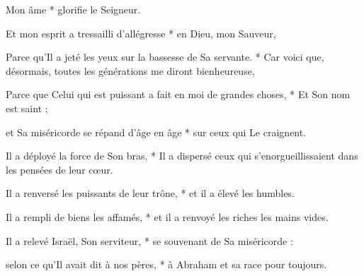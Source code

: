 \item Mon âme * glorifie le Seigneur.
\item Et mon esprit a tressailli d'allégresse * en Dieu, mon Sauveur,
\item Parce qu'Il a jeté les yeux sur la bassesse de Sa servante. * Car voici que, désormais, toutes les générations me diront bienheureuse,
\item Parce que Celui qui est puissant a fait en moi de grandes choses, * Et Son nom est saint ;
\item et Sa miséricorde se répand d'âge en âge * sur ceux qui Le craignent.
\item Il a déployé la force de Son bras, * Il a dispersé ceux qui s'enorgueillissaient dans les pensées de leur cœur.
\item Il a renversé les puissants de leur trône, * et il a élevé les humbles.
\item Il a rempli de biens les affamés, * et il a renvoyé les riches les mains vides.
\item Il a relevé Israël, Son serviteur, * se souvenant de Sa miséricorde :
\item selon ce qu'Il avait dit à nos pères, * à Abraham et sa race pour toujours.